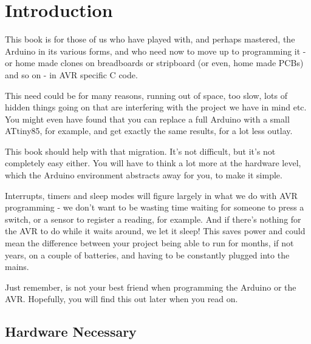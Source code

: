 \section*{Introduction}\label{introduction}

This book is for those of us who have played with, and perhaps mastered, the Arduino in its various forms, and who need now to move up to programming it - or home made clones on breadboards or stripboard (or even, home made PCBs) and so on - in AVR specific C code.

This need could be for many reasons, running out of space, too slow, lots of hidden things going on that are interfering with the project we have in mind etc. You might even have found that you can replace a full Arduino with a small ATtiny85, for example, and get exactly the same results, for a lot less outlay.

This book should help with that migration. It's not difficult, but it's not completely easy either. You will have to think a lot more at the hardware level, which the  Arduino environment abstracts away for you, to make it simple.

Interrupts, timers and sleep modes will figure largely in what we do with AVR programming - we don't want to be wasting time waiting for someone to press a switch, or a sensor to register a reading, for example. And if there's nothing for the AVR to do while it waits around, we let it sleep! This saves power and could mean the difference between your project being able to run for months, if not years, on a couple of batteries, and having to be constantly plugged into the mains.

Just remember,  is not your best friend when programming the  Arduino or the AVR. Hopefully, you will find this out later when you read on.

\subsection*{Hardware Necessary}\label{hardware-necessary}

